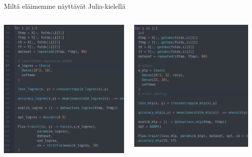 \documentclass[presentation]{beamer}
\begin{document}
\begin{frame}{Miltä eläimemme näyttävät Julia-kielellä}
    	\begin{columns}[]
			\centering
				\includegraphics[width=\textwidth]{logres_elain.png}

		    \centering
				\includegraphics[width=\textwidth]{mlp_elain.png}

	\end{columns}
    
\end{frame}
\end{document}
